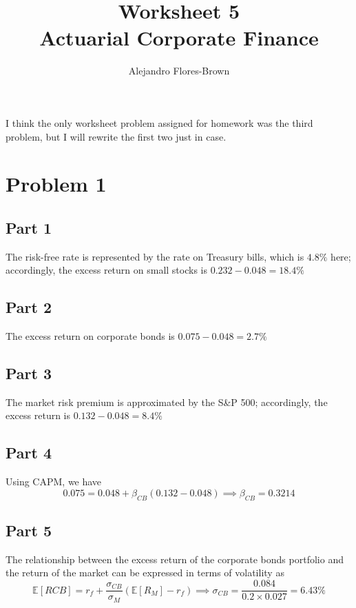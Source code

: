 \documentclass[12pt, letterpaper, parskip = full]{article}
\title{Worksheet 5 \\ Actuarial Corporate Finance}
\author{Alejandro Flores-Brown}
\newcommand{\Ex}[1]{\mathbb{E}\left[#1\right]}
\begin{document}
    \maketitle

    I think the only worksheet problem assigned for homework was the third problem, but I will rewrite the first two just in case.

    \section{Problem 1}

    \subsection{Part 1}

    The risk-free rate is represented by the rate on Treasury bills, which is \(4.8\%\) here; accordingly, the excess return on small stocks is \(\boxed{0.232 - 0.048 = 18.4\%}\)

    \subsection{Part 2}

    The excess return on corporate bonds is \(\boxed{0.075 - 0.048 = 2.7\%}\)

    \subsection{Part 3}

    The market risk premium is approximated by the S\&P 500; accordingly, the excess return is \(\boxed{0.132 - 0.048 = 8.4\%}\)

    \subsection{Part 4}

    Using CAPM, we have
    \[  0.075 = 0.048 + \beta_{CB} (0.132 - 0.048) \implies \boxed{\beta_{CB} = 0.3214}\]

    \subsection{Part 5}

    The relationship between the excess return of the corporate bonds portfolio and the return of the market can be expressed in terms of volatility as
    \[ \Ex{R{CB}} = r_f + \frac{\sigma_{CB}}{\sigma_{M}} (\Ex{R_M} - r_f) \implies \boxed{\sigma_{CB} = \frac{0.084}{0.2 \times 0.027} = 6.43\%}    \]
\end{document}
